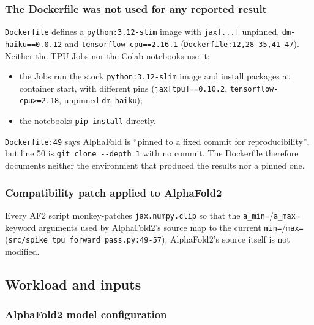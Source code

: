 \subsubsection{The Dockerfile was not used for any reported result}
\label{sec:meth-sw-dockerfile}

\texttt{Dockerfile} defines a \texttt{python:3.12-slim} image with \texttt{jax[...]} unpinned,
\texttt{dm-haiku==0.0.12} and \texttt{tensorflow-cpu==2.16.1} (\texttt{Dockerfile:12,28-35,41-47}).
Neither the TPU Jobs nor the Colab notebooks use it:
\begin{itemize}
  \item the Jobs run the stock \texttt{python:3.12-slim} image and install packages at
    container start, with different pins (\texttt{jax[tpu]==0.10.2}, \texttt{tensorflow-cpu>=2.18},
    unpinned \texttt{dm-haiku});
  \item the notebooks \texttt{pip install} directly.
\end{itemize}

\texttt{Dockerfile:49} says AlphaFold is ``pinned to a fixed commit for
reproducibility'', but line 50 is \texttt{git clone -{}-depth 1} with no commit. The
Dockerfile therefore documents neither the environment that produced the
results nor a pinned one.

\subsubsection{Compatibility patch applied to AlphaFold2}
\label{sec:meth-sw-patch}

Every AF2 script monkey-patches \texttt{jax.numpy.clip} so that the \texttt{a\_min=}/\texttt{a\_max=}
keyword arguments used by AlphaFold2's source map to the current \texttt{min=}/\texttt{max=}
(\texttt{src/\allowbreak{}spike\_\allowbreak{}tpu\_\allowbreak{}forward\_\allowbreak{}pass.py:49-57}). AlphaFold2's source itself is not modified.

\subsection{Workload and inputs}
\label{sec:meth-workload}

\subsubsection{AlphaFold2 model configuration}
\label{sec:meth-af2-config}

